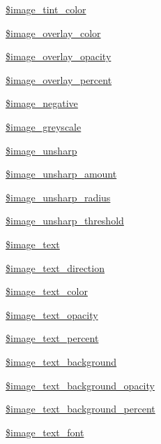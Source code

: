 \begin{DoxyCompactItemize}
\item 
\hyperlink{classupload_a92ebf364b331213fd13a8bc3057ea19c}{\$image\+\_\+tint\+\_\+color}
\item 
\hyperlink{classupload_acf9766b25cb3eab86a2c9b54da974bc4}{\$image\+\_\+overlay\+\_\+color}
\item 
\hyperlink{classupload_ad664f8f6090117a209405c74793d081d}{\$image\+\_\+overlay\+\_\+opacity}
\item 
\hyperlink{classupload_a02769c01c01dd899ba603f46cc6c47f8}{\$image\+\_\+overlay\+\_\+percent}
\item 
\hyperlink{classupload_aa92fb0f9781c859b2c6510d700c8fa63}{\$image\+\_\+negative}
\item 
\hyperlink{classupload_a33e725b147c4a09052338049070f27e7}{\$image\+\_\+greyscale}
\item 
\hyperlink{classupload_a950be29b63e625c72e7d4730df276acd}{\$image\+\_\+unsharp}
\item 
\hyperlink{classupload_af3d5d7e03380225a94289574f5942517}{\$image\+\_\+unsharp\+\_\+amount}
\item 
\hyperlink{classupload_a03414b0ffe9442d29009577a16862cce}{\$image\+\_\+unsharp\+\_\+radius}
\item 
\hyperlink{classupload_a316e130cac7f69fd62fde8f251a5417b}{\$image\+\_\+unsharp\+\_\+threshold}
\item 
\hyperlink{classupload_ace96dfde5bd8c0339818d1f25774ba2a}{\$image\+\_\+text}
\item 
\hyperlink{classupload_a0f899a45970a22c16ff5582a80cf101b}{\$image\+\_\+text\+\_\+direction}
\item 
\hyperlink{classupload_ae2df9a643b41009c9d8165c1415c85da}{\$image\+\_\+text\+\_\+color}
\item 
\hyperlink{classupload_a5050bc556b21c0b70aad7792da8a2b7c}{\$image\+\_\+text\+\_\+opacity}
\item 
\hyperlink{classupload_a726c4ce58be87c00b2c2dba2f6bd9275}{\$image\+\_\+text\+\_\+percent}
\item 
\hyperlink{classupload_a7c74de71afe68ae18f952b60cc5efbf1}{\$image\+\_\+text\+\_\+background}
\item 
\hyperlink{classupload_a0d9b93f06b071c28764fd69a9bb641e9}{\$image\+\_\+text\+\_\+background\+\_\+opacity}
\item 
\hyperlink{classupload_a737c8c5af94f24ac81d1ced28627c3f1}{\$image\+\_\+text\+\_\+background\+\_\+percent}
\item 
\hyperlink{classupload_a88e84b98d09f0d6240a4fd2b318a355a}{\$image\+\_\+text\+\_\+font}

\end{DoxyCompactItemize}
